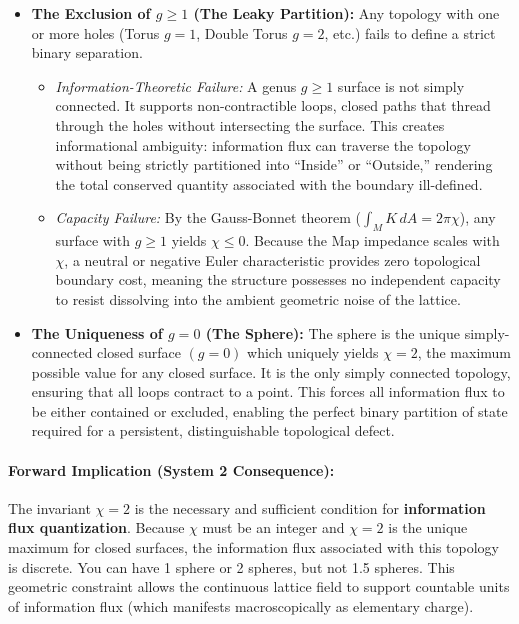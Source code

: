 \begin{itemize}
    \item \textbf{The Exclusion of $g \geq 1$ (The Leaky Partition):} Any topology with one or more holes (Torus $g=1$, Double Torus $g=2$, etc.) fails to define a strict binary separation.
    \begin{itemize}
        \item \textit{Information-Theoretic Failure:} A genus $g \geq 1$ surface is not simply connected. It supports non-contractible loops, closed paths that thread through the holes without intersecting the surface. This creates informational ambiguity: information flux can traverse the topology without being strictly partitioned into ``Inside'' or ``Outside,'' rendering the total conserved quantity associated with the boundary ill-defined.
        
        \item \textit{Capacity Failure:} By the Gauss-Bonnet theorem ($\int_M K \, dA = 2\pi\chi$), any surface with $g \geq 1$ yields $\chi \leq 0$. Because the Map impedance scales with $\chi$, a neutral or negative Euler characteristic provides zero topological boundary cost, meaning the structure possesses no independent capacity to resist dissolving into the ambient geometric noise of the lattice.
    \end{itemize}

    \item \textbf{The Uniqueness of $g=0$ (The Sphere):}
    The sphere is the unique simply-connected closed surface $(g=0)$ which uniquely yields $\chi=2$, the maximum possible value for any closed surface. It is the only simply connected topology, ensuring that all loops contract to a point. This forces all information flux to be either contained or excluded, enabling the perfect binary partition of state required for a persistent, distinguishable topological defect.
\end{itemize}

\paragraph{Forward Implication (System 2 Consequence):} 
The invariant $\chi=2$ is the necessary and sufficient condition for \textbf{information flux quantization}. Because $\chi$ must be an integer and $\chi=2$ is the unique maximum for closed surfaces, the information flux associated with this topology is discrete. You can have 1 sphere or 2 spheres, but not 1.5 spheres. This geometric constraint allows the continuous lattice field to support countable units of information flux (which manifests macroscopically as elementary charge).

